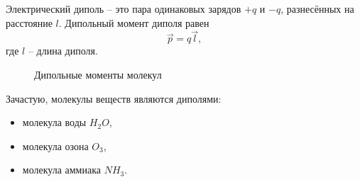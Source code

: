     Электрический диполь -- это пара одинаковых зарядов \( +q \) и \( -q \), 
    разнесённых  на расстояние \( l \). Дипольный момент диполя равен 
    \[
        \vec{p} = q\vec{l},
    \]
    где \( l \) -- длина диполя.

    \begin{figure}[b]
        \center
        \caption{Дипольные моменты молекул}
    \end{figure}   

    Зачастую, молекулы веществ являются диполями:   
    \begin{itemize}
        \item молекула воды \( H_2O \),
        \item молекула озона \( O_3 \),
        \item молекула аммиака \( NH_3 \).
    \end{itemize}

